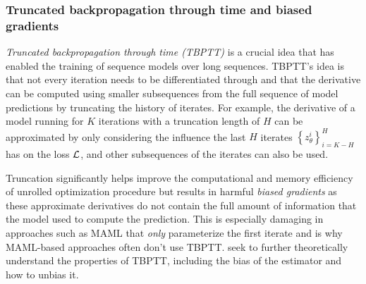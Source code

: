 \documentclass[twoside,11pt]{article}
\begin{document}
\subsubsection{Truncated backpropagation through time and biased gradients}
\begin{center}
\end{center}
\vspace{-10mm}

\emph{Truncated backpropagation through time (TBPTT)}
\citep{werbos1990backpropagation,jaeger2002tutorial}
is a crucial idea that has enabled the
training of sequence models over long sequences.
TBPTT's idea is that not every iteration needs to be
differentiated through and that the derivative
can be computed using smaller subsequences from
the full sequence of model predictions by
truncating the history of iterates.
For example, the derivative of a model running
for $K$ iterations with a truncation length of $H$
can be approximated by only considering the
influence the last $H$ iterates
$\left\{z_\theta^{i}\right\}_{i=K-H}^H$ has on the loss ${\mathcal{L}}$,
and other subsequences of the iterates can
also be used.

Truncation significantly helps improve the computational
and memory efficiency of unrolled optimization procedure
but results in harmful \emph{biased gradients} as
these approximate derivatives do not contain
the full amount of information that the model used
to compute the prediction.
This is especially damaging in approaches
such as MAML \citep{finn2017model} that \emph{only}
parameterize the first iterate and is why MAML-based
approaches often don't use TBPTT.
\citet{tallec2017unbiasing,wu2018understanding,liao2018reviving,shaban2019truncated,vicol2021unbiased}
seek to further theoretically understand the properties
of TBPTT, including the bias of the estimator
and how to unbias it.
\end{document}
